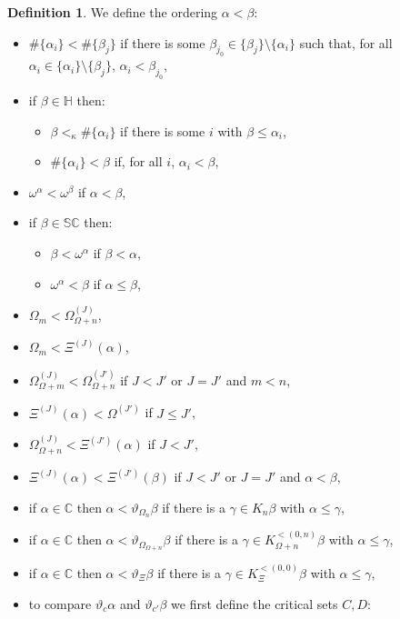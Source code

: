 \documentclass[11pt]{amsart}
\theoremstyle{definition}
\newtheorem{definition}[theorem]{Definition}
\begin{document}
\begin{definition}
  We define the ordering $\alpha<\beta$:
  \begin{itemize}
  \item $\#\{\alpha_i\}<\#\{\beta_j\}$ if there is some $\beta_{j_0}\in\{\beta_j\}\setminus\{\alpha_i\}$ such that, for all $\alpha_i\in\{\alpha_i\}\setminus\{\beta_j\}$, $\alpha_i<\beta_{j_0}$,
\item if $\beta\in\mathbb{H}$ then:
  \begin{itemize}
  \item $\beta<_\kappa\#\{\alpha_i\}$ if there is some $i$ with $\beta\leq\alpha_i$,
  \item $\#\{\alpha_i\}<\beta$ if, for all $i$, $\alpha_i<\beta$,
  \end{itemize}
\item $\omega^\alpha<\omega^\beta$ if $\alpha<\beta$,
\item if $\beta\in\mathbb{SC}$ then:
  \begin{itemize}
  \item $\beta<\omega^\alpha$ if $\beta<\alpha$,
  \item $\omega^\alpha<\beta$ if $\alpha\leq\beta$,
  \end{itemize}
\item $\Omega_m<\Omega^{(J)}_{\Omega+n}$,
\item $\Omega_m<\Xi^{(J)}(\alpha)$,
\item $\Omega^{(J)}_{\Omega+m}<\Omega^{(J')}_{\Omega+n}$ if $J<J'$ or $J=J'$ and $m<n$,
\item $\Xi^{(J)}(\alpha)<\Omega^{(J')}$ if $J\leq J'$,
\item $\Omega^{(J)}_{\Omega+n}<\Xi^{(J')}(\alpha)$ if $J<J'$,
\item $\Xi^{(J)}(\alpha)<\Xi^{(J')}(\beta)$ if $J<J'$ or $J=J'$ and $\alpha<\beta$,
\item if $\alpha\in\mathbb{C}$ then $\alpha<\vartheta_{\Omega_n}\beta$ if there is a $\gamma\in K_n\beta$ with $\alpha\leq\gamma$,
\item if $\alpha\in\mathbb{C}$ then $\alpha<\vartheta_{\Omega_{\Omega+n}}\beta$ if there is a $\gamma\in K^{<(0,n)}_{\Omega+n}\beta$ with $\alpha\leq\gamma$,
\item if $\alpha\in\mathbb{C}$ then $\alpha<\vartheta_{\Xi}\beta$ if there is a $\gamma\in K^{<(0,0)}_{\Xi}\beta$ with $\alpha\leq\gamma$,
\item to compare $\vartheta_c\alpha$ and $\vartheta_{c'}\beta$ we first define the critical sets $C,D$:
  \begin{itemize}

\end{itemize}
\end{itemize}
\end{definition}
\end{document}

